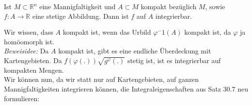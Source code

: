 \begin{satz}
Ist $M\subset\mathbb{R}^n$ eine Mannigfaltigkeit und $A\subset M$ 
kompakt bezüglich $M$, sowie $f:A\rightarrow\mathbb{R}$ eine stetige 
Abbildung. Dann ist $f$ auf $A$ integrierbar.
\end{satz}
Wir wissen, dass $A$ kompakt ist, wenn das Urbild $\varphi^-1(A)$ kompakt 
ist, da $\varphi$ ja homöomorph ist.\\
\emph{Beweisidee:} Da $A$ kompakt ist, gibt es eine endliche 
Überdeckung mit Kartengebieten. Da $f(\varphi(.))\sqrt{g^\varphi(.)}$ 
stetig ist, ist es integrierbar auf kompakten Mengen.\\
\linebreak
Wir können nun, da wir statt nur auf Kartengebieten, auf ganzen 
Mannigfaltigkeiten integrieren können, die Integraleigenschaften 
aus Satz 30.7 neu formulieren:
\newpage
